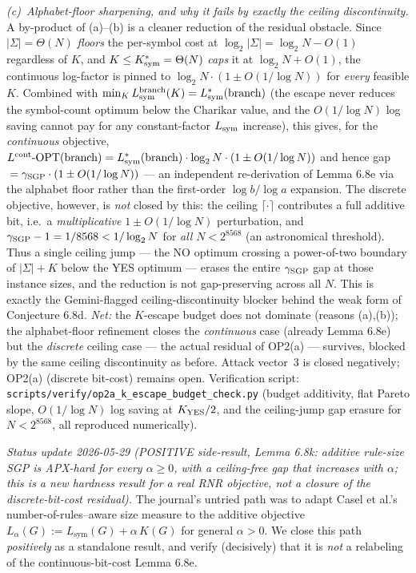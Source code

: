 \documentclass[
]{article}
\begin{document}
\emph{(c)~Alphabet-floor sharpening, and why it fails by exactly the
ceiling discontinuity.} A by-product of (a)--(b) is a cleaner
reduction of the residual obstacle. Since $|\Sigma| = \Theta(N)$
\emph{floors} the per-symbol cost at $\log_2|\Sigma| = \log_2 N -
O(1)$ regardless of $K$, and $K \leq K^*_{\rm sym} = \Theta(N)$
\emph{caps} it at $\log_2 N + O(1)$, the continuous log-factor is
pinned to $\log_2 N \cdot (1 \pm O(1/\log N))$ for \emph{every}
feasible $K$. Combined with $\min_K L_{\rm sym}^{\rm branch}(K) =
L^*_{\rm sym}({\rm branch})$ (the escape never reduces the
symbol-count optimum below the Charikar value, and the $O(1/\log N)$
log saving cannot pay for any constant-factor $L_{\rm sym}$
increase), this gives, for the \emph{continuous} objective,
$L^{\rm cont}\text{-OPT}({\rm branch}) = L^*_{\rm sym}({\rm branch})
\cdot \log_2 N \cdot (1 \pm O(1/\log N))$ and hence
gap${} = \gamma_{\rm SGP} \cdot (1 \pm O(1/\log N))$ --- an
independent re-derivation of Lemma 6.8e via the alphabet floor rather
than the first-order $\log b / \log a$ expansion. The discrete
objective, however, is \emph{not} closed by this: the ceiling
$\lceil \cdot \rceil$ contributes a full additive bit, i.e.\ a
\emph{multiplicative} $1 \pm O(1/\log N)$ perturbation, and
$\gamma_{\rm SGP} - 1 = 1/8568 < 1/\log_2 N$ for \emph{all} $N <
2^{8568}$ (an astronomical threshold). Thus a single ceiling jump ---
the NO optimum crossing a power-of-two boundary of $|\Sigma| + K$
below the YES optimum --- erases the entire $\gamma_{\rm SGP}$ gap at
those instance sizes, and the reduction is not gap-preserving across
all $N$. This is exactly the Gemini-flagged ceiling-discontinuity
blocker behind the weak form of Conjecture 6.8d. \emph{Net:} the
$K$-escape budget does not dominate (reasons (a),(b)); the
alphabet-floor refinement closes the \emph{continuous} case (already
Lemma 6.8e) but the \emph{discrete} ceiling case --- the actual
residual of OP2(a) --- survives, blocked by the same ceiling
discontinuity as before. Attack vector~3 is closed negatively;
OP2(a) (discrete bit-cost) remains open. Verification script:
\texttt{scripts/verify/op2a\_k\_escape\_budget\_check.py} (budget
additivity, flat Pareto slope, $O(1/\log N)$ log saving at $K_{\rm
YES}/2$, and the ceiling-jump gap erasure for $N < 2^{8568}$,
all reproduced numerically).

\emph{Status update 2026-05-29 (POSITIVE side-result, Lemma 6.8k:
additive rule-size SGP is APX-hard for every $\alpha \geq 0$, with a
ceiling-free gap that \emph{increases} with $\alpha$; this is a new
hardness result for a real RNR objective, not a closure of the
discrete-bit-cost residual).} The journal's untried path was to adapt
Casel et al.'s number-of-rules--aware size measure to the additive
objective $L_\alpha(G) := L_{\mathrm{sym}}(G) + \alpha\,K(G)$ for general
$\alpha > 0$. We close this path \emph{positively} as a standalone
result, and verify (decisively) that it is \emph{not} a relabeling of
the continuous-bit-cost Lemma 6.8e.
\end{document}
